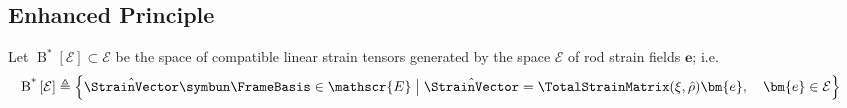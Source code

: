 


\subsection{Enhanced Principle}
Let $\operatorname{B}^*\left[\mathcal{E}\right] \subset \mathscr{E}$ be the space of compatible linear strain tensors generated by the space $\mathcal{E}$ of rod strain fields \(\bm{e}\); i.e. 
$$
\begin{aligned}
\operatorname{B^*}\left[\mathcal{E}\right]
&\triangleq \left\{
\hat{\StrainVector} \symbun \FrameBasis \in \mathscr{E} 
\bigm| 
\hat{\StrainVector}%
=\TotalStrainMatrix(\xi,\hat{\rho}) \bm{e},
\quad \bm{e} \in \mathcal{E}
\right\}
\end{aligned}
$$




